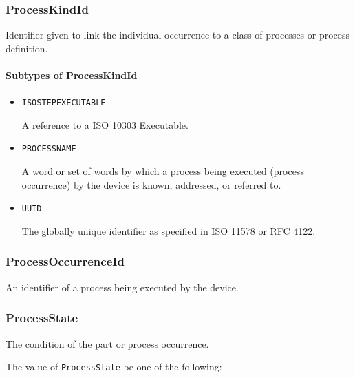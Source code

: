 \subsubsection{ProcessKindId}
\label{sec:ProcessKindId}



Identifier given to link the individual occurrence to a class of processes or process definition.



\paragraph{Subtypes of ProcessKindId}\mbox{}
\label{sec:Subtypes of ProcessKindId}

\begin{itemize}

\item \texttt{ISO\textunderscore STEP\textunderscore EXECUTABLE}


A reference to a ISO 10303 Executable.

\item \texttt{PROCESS\textunderscore NAME}


A word or set of words by which a process being executed (process occurrence) by the device is known, addressed, or referred to.


\item \texttt{UUID}


The globally unique identifier as specified in ISO 11578 or RFC 4122.


\end{itemize}

\subsubsection{ProcessOccurrenceId}
\label{sec:ProcessOccurrenceId}



An identifier of a process being executed by the device.


\subsubsection{ProcessState}
\label{sec:ProcessState}



The condition of the part or process occurrence.


The value of \texttt{ProcessState} \MUST be one of the following: 


